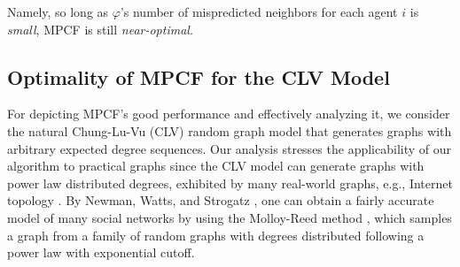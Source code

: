 \documentclass[letterpaper]{article} %
\begin{document}
Namely, so long as $\varphi$'s number of mispredicted neighbors for each agent $i$ is \textit{small}, MPCF is still \textit{near-optimal}.


%

\subsection{Optimality of MPCF for the CLV Model}
\label{sec:Optimality of MPCF for the CLV Model}
For depicting MPCF’s good performance and effectively analyzing it, we consider the natural Chung-Lu-Vu (CLV) random graph model \cite{chung2004spectra} that generates graphs with arbitrary expected degree sequences. Our analysis stresses the applicability of our algorithm to practical graphs since the CLV model can generate graphs with power law distributed degrees, exhibited by many real-world graphs, e.g., Internet topology \cite{chung2004spectra}. By Newman, Watts, and Strogatz , one can obtain a fairly accurate model of many social networks by using the Molloy-Reed method \cite{molloy1995critical}, which samples a graph from a family of random graphs with degrees distributed following a power law with exponential cutoff.

%

\end{document}
